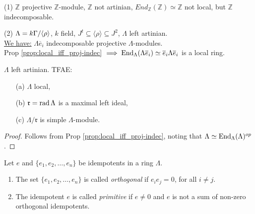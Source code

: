 
\begin{exam}
(1) $\mathbb{Z}$ projective $\mathbb{Z}$-module, $\mathbb{Z}$ not
artinian, $End_\mathbb{Z}(\mathbb{Z}) \simeq \mathbb{Z}$ not local,
but $\mathbb{Z}$ indecomposable. 

(2) $\Lambda = k\Gamma / \langle \rho \rangle$, $k$ field, $J^t \subseteq
\langle \rho \rangle \subseteq J^2$, $\Lambda$ left artinian.\\ 
\underline{We have:} $\Lambda\overline{e}_i$ indecomposable projective
$\Lambda$-modules.\\ 
Prop \ref{prop:local_iff_proj-indec}
$\implies \operatorname{End}_\Lambda(\Lambda\overline{e}_i) \simeq \overline{e}_i
\Lambda \overline{e}_i$ is a local ring. 
\end{exam}

\begin{cor}\label{cor:38}
$\Lambda$ left artinian. TFAE:
\begin{enumerate}
\item[(a)] $\Lambda$ local,
\item[(b)] $\mathfrak{r} = \operatorname{rad}\nolimits \Lambda$ is a maximal left ideal,
\item[(c)] $\Lambda/\mathfrak{r}$ is simple $\Lambda$-module.
\end{enumerate}
\end{cor}
\begin{proof}
Follows from Prop \ref{prop:local_iff_proj-indec}, noting that
$\Lambda \simeq \operatorname{End}_\Lambda(\Lambda)^{op}$. 
\end{proof}

\begin{defin}
Let $e$ and $\{e_1,e_2,\ldots,e_n\}$ be idempotents in a ring $\Lambda$. 
\begin{enumerate}[\rm(i)]
\item The set $\{e_1,e_2,\ldots,e_n\}$ is called \emph{orthogonal} if
  $e_ie_j = 0$, for all $i \neq j$. 
\item The idempotent $e$ is called \emph{primitive} if  $e\neq 0$ and
  $e$ is not a sum of non-zero orthogonal idempotents. 
\end{enumerate}

\end{defin}

